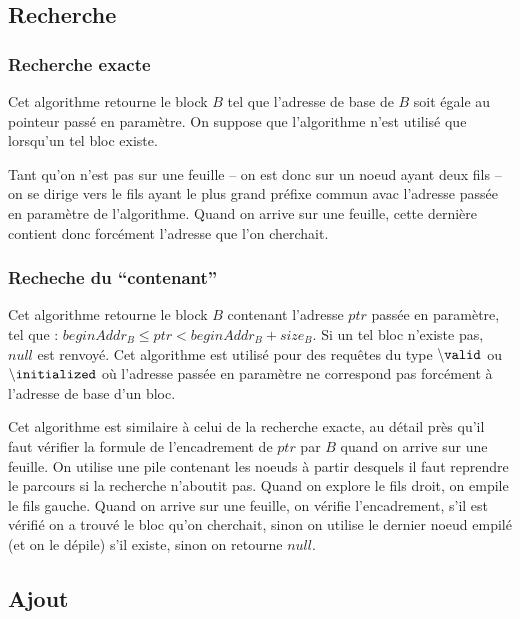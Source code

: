\subsection{Recherche}



\subsubsection{Recherche exacte}

Cet algorithme retourne le block $B$ tel que l'adresse de base de $B$ soit égale
au pointeur passé en paramètre. On suppose que l'algorithme n'est utilisé que
lorsqu'un tel bloc existe.

Tant qu'on n'est pas sur une feuille -- on est donc sur un noeud ayant deux fils
-- on se dirige vers le fils ayant le plus grand préfixe commun avac l'adresse
passée en paramètre de l'algorithme. Quand on arrive sur une feuille, cette
dernière contient donc forcément l'adresse que l'on cherchait.

\subsubsection{Recheche du ``contenant''}

Cet algorithme retourne le block $B$ contenant l'adresse $ptr$ passée en
paramètre, tel que : $beginAddr_B \le ptr < beginAddr_B + size_B$. Si un tel
bloc n'existe pas, $null$ est renvoyé. Cet algorithme est utilisé pour des
requêtes du type ${\tt \backslash valid}$ ou ${\tt \backslash initialized}$ où
l'adresse passée en paramètre ne correspond pas forcément à l'adresse de base
d'un bloc.

Cet algorithme est similaire à celui de la recherche exacte, au détail près
qu'il faut vérifier la formule de l'encadrement de $ptr$ par $B$ quand on arrive
sur une feuille. On utilise une pile contenant les noeuds à partir desquels il
faut reprendre le parcours si la recherche n'aboutit pas. Quand on explore le
fils droit, on empile le fils gauche. Quand on arrive sur une feuille, on
vérifie l'encadrement, s'il est vérifié on a trouvé le bloc qu'on cherchait,
sinon on utilise le dernier noeud empilé (et on le dépile) s'il existe, sinon
on retourne $null$.

\subsection{Ajout}


